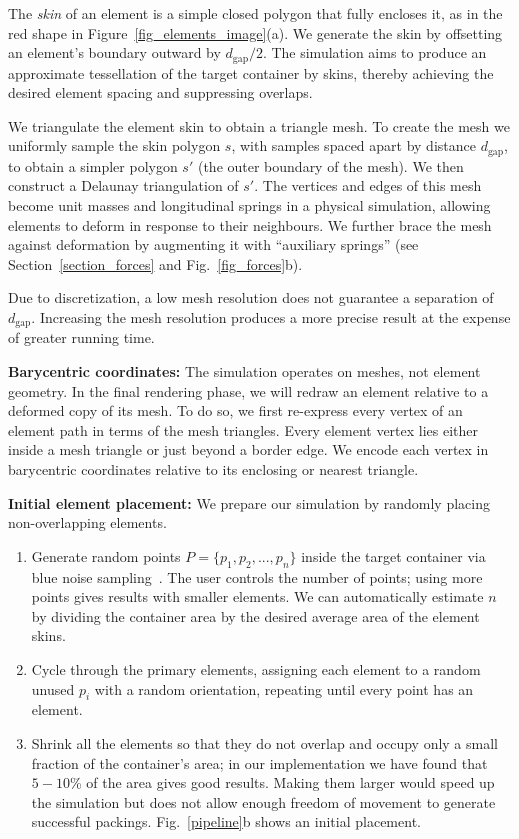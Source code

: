 The \textit{skin} of an element is a simple closed polygon 
that fully encloses it, 
as in the red shape in Figure~\ref{fig_elements_image}(a).
We generate the skin 
by offsetting 
an element's boundary outward by $d_\mathrm{gap}/2$. 
The simulation aims to produce an approximate tessellation of the target
container by  skins, thereby achieving the desired element spacing and
suppressing overlaps.

We triangulate the element skin to obtain a triangle mesh.
To create the mesh we uniformly sample the skin polygon $s$, with samples
spaced apart by distance $d_\mathrm{gap}$,
to obtain a simpler polygon $s'$ (the outer boundary of the mesh).
We then construct a Delaunay triangulation of $s'$.
The vertices and edges of this mesh become unit 
masses and longitudinal
springs in a physical simulation, allowing elements to deform in response to
their neighbours.  
We further brace the mesh against
deformation by augmenting it with ``auxiliary springs'' (see
Section~\ref{section_forces} and Fig.~\ref{fig_forces}b).

Due to discretization, a low mesh resolution does not guarantee a separation of $d_\mathrm{gap}$. 
Increasing the mesh resolution produces a more precise result at the expense of greater running time.

\textbf{Barycentric coordinates:}
The simulation operates on meshes, not element geometry.  In the final
rendering phase, we will redraw an element relative to a deformed copy of
its mesh.  To do so, we first re-express every vertex of an element path in 
terms of the mesh triangles.  Every element vertex lies either inside a mesh
triangle or just beyond a border edge.  We encode each vertex in barycentric
coordinates relative to its enclosing or nearest triangle.

\textbf{Initial element placement:}
We prepare our simulation by randomly placing non-overlapping elements.
\begin{enumerate}
	\item Generate random points $P = \{ p_1, p_2,..., p_n \}$ 
		  inside the target container 
	      via blue noise sampling~\cite{Bridson2007}.
	      The user controls the number of points; using more points gives results
	      with smaller elements.  We can automatically estimate $n$ by
		  dividing the container area by the desired average area of the element skins.
	\item Cycle through the primary elements, assigning each element to a 
		  random unused $p_i$ with a random orientation, repeating until 
		  every point has an element.
	\item Shrink all the elements so that they do not overlap and occupy only
		  a small fraction of the container's area; in our implementation we
		  have found that $5-10$\% of the area gives good results. Making them
		  larger would speed up the simulation but does
	      not allow enough freedom of movement to generate successful
		  packings.  Fig.~\ref{pipeline}b shows an initial placement.	      
\end{enumerate}


